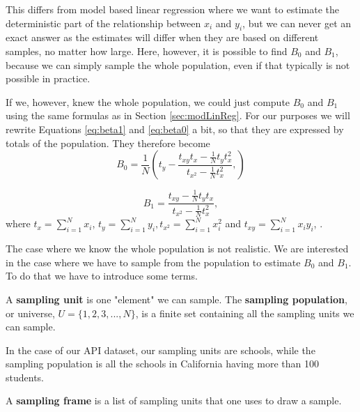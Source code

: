 \documentclass{article}
\begin{document}
This differs from model based linear regression where we want to estimate the
deterministic part of the relationship between \(x_i\) and \(y_i\), but we can
never get an exact answer as the estimates will differ when they are based on
different samples, no matter how large. Here, however, it is possible to find \(B_0\) and
\(B_1\), because we can simply sample the whole population, even if that typically
is not possible in practice.

If we, however, knew the whole population, we could just compute \(B_0\) and \(B_1\) using the same formulas
as in Section \ref{sec:modLinReg}. For our purposes we will rewrite Equations
\ref{eq:beta1} and \ref{eq:beta0} a bit,
so that they are expressed by totals of the population. They therefore become
\begin{equation} \label{eq:B0}
 B_0 = \frac{1}{N} \left( t_y - \frac{t_{xy} t_x - \frac{1}{N} t_y t_x^2}
   {t_{x^2} - \frac{1}{N} t_x^2},
  \right)
\end{equation}

\begin{equation} \label{eq:B1}
 B_1 = \frac{t_{xy} - \frac{1}{N} t_y t_x}
   {t_{x^2} - \frac{1}{N} t_x^2},
\end{equation}
where \(t_x = \sum_{i = 1}^N x_i\), \(t_y = \sum_{i = 1}^N y_i, t_{x^2} =
\sum_{i = 1}^N x_i^2\) and \(t_{xy} =
\sum_{i = 1}^N x_i y_i\), \cite[Chapter 11]{sampReg}.

The case where we know the whole population is not realistic. We are interested in the case where we have to sample from the
population to estimate \(B_0\) and \(B_1\). To do that we have to introduce some terms.


\begin{definition} \label{def:sampUnitPop}
 A \textbf{sampling unit} is one "element" we can sample.
 The \textbf{sampling population}, or universe, \(U = \{1, 2, 3, ..., N\}\), is a
 finite set containing all the sampling units we can sample.
\end{definition}

In the case of our API dataset, our sampling units are schools, while
the sampling population is all the schools in California having more than 100 students.

\begin{definition} \label{def:sampFrame}
 A \textbf{sampling frame} is a list of sampling units that one uses to draw a sample.
\end{definition}
\end{document}
